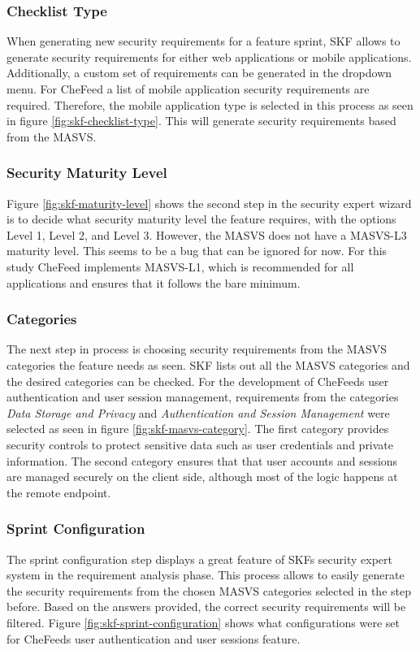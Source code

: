 \subsubsection{Checklist Type}
When generating new security requirements for a feature sprint, SKF allows to generate security requirements for either web applications or mobile applications. Additionally, a custom set of requirements can be generated in the dropdown menu. For CheFeed a list of mobile application security requirements are required. Therefore, the mobile application type is selected in this process as seen in figure \ref{fig:skf-checklist-type}. This will generate security requirements based from the MASVS.

\subsubsection{Security Maturity Level}
Figure \ref{fig:skf-maturity-level} shows the second step in the security expert wizard is to decide what security maturity level the feature requires, with the options Level 1, Level 2, and Level 3. However, the MASVS does not have a MASVS-L3 maturity level. This seems to be a bug that can be ignored for now. For this study CheFeed implements MASVS-L1, which is recommended for all applications and ensures that it follows the bare minimum.

\subsubsection{Categories}
The next step in process is choosing security requirements from the MASVS categories the feature needs as seen. SKF lists out all the MASVS categories and the desired categories can be checked. For the development of CheFeeds user authentication and user session management, requirements from the categories \emph{Data Storage and Privacy} and \emph{Authentication and Session Management} were selected as seen in figure \ref{fig:skf-masvs-category}. The first category provides security controls to protect sensitive data such as user credentials and private information. The second category ensures that that user accounts and sessions are managed securely on the client side, although most of the logic happens at the remote endpoint.

\subsubsection{Sprint Configuration}
The sprint configuration step displays a great feature of SKFs security expert system in the requirement analysis phase. This process allows to easily generate the security requirements from the chosen MASVS categories selected in the step before. Based on the answers provided, the correct security requirements will be filtered. Figure \ref{fig:skf-sprint-configuration} shows what configurations were set for CheFeeds user authentication and user sessions feature.

